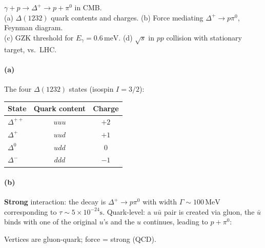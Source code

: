 \documentclass[11pt]{article}
\newcommand{\Q}[1]{\begin{question}#1\end{question}}
\newcommand{\MeV}{\,\mathrm{MeV}}
\begin{document}
\Q{$\gamma+p\to\Delta^+\to p+\pi^0$ in CMB.\\
(a) $\Delta(1232)$ quark contents and charges. (b) Force mediating $\Delta^+\to p\pi^0$, Feynman diagram.\\
(c) GZK threshold for $E_\gamma=0.6\,\mathrm{meV}$. (d) $\sqrt{s}$ in $pp$ collision with stationary target, vs.\ LHC.}

\paragraph{(a)} The four $\Delta(1232)$ states (isospin $I=3/2$):
\begin{center}
\begin{tabular}{@{}lcc@{}}\hline
State & Quark content & Charge\\\hline
$\Delta^{++}$ & $uuu$ & $+2$\\
$\Delta^{+}$  & $uud$ & $+1$\\
$\Delta^{0}$  & $udd$ & $0$\\
$\Delta^{-}$  & $ddd$ & $-1$\\\hline
\end{tabular}
\end{center}

\paragraph{(b)} \textbf{Strong} interaction: the decay is $\Delta^{+}\to p\pi^0$ with width $\Gamma\sim 100\MeV$ corresponding to $\tau\sim 5\times 10^{-24}\mathrm{s}$. Quark-level: a $u\bar u$ pair is created via gluon, the $\bar u$ binds with one of the original $u$'s and the $u$ continues, leading to $p+\pi^0$:
\begin{center}
\end{center}
Vertices are gluon-quark; force = strong (QCD).
\end{document}
